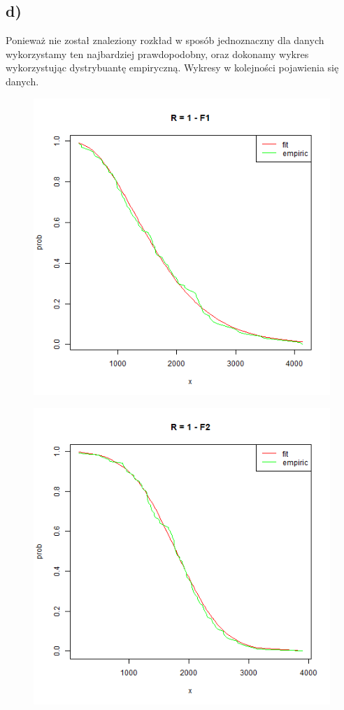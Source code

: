 \documentclass{article}
\begin{document}
\subsection{d)}
Ponieważ nie został znaleziony rozkład w sposób jednoznaczny dla danych wykorzystamy ten najbardziej prawdopodobny, oraz dokonamy wykres wykorzystując dystrybuantę empiryczną. Wykresy w kolejności pojawienia się danych.
\newpage
\begin{figure}[h!] \begin{center}
\includegraphics[height=0.4\textheight, angle=0]{"kolos2_R1.png"}
\end{center} \end{figure}

\begin{figure}[h!] \begin{center}
\includegraphics[height=0.4\textheight, angle=0]{"kolos2_R2.png"}
\end{center} \end{figure}
\end{document}
